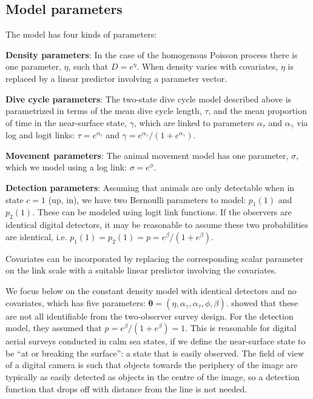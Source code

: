 \documentclass[useAMS, usenatbib, referee]{biom}\usepackage[]{graphicx}\usepackage[]{color}
\begin{document}
\subsection{Model parameters}
\label{sec:model_parameters}

The model has four kinds of parameters:

\textbf{Density parameters}: In the case of the homogenous Poisson process there is one parameter, $\eta$, such that $D=e^{\eta}$. When density varies with covariates, $\eta$ is replaced by a linear predictor involving a parameter vector.

\textbf{Dive cycle parameters}: The two-state dive cycle model described above is parametrized in terms of the mean dive cycle length, $\tau$, and the mean proportion of time in the near-surface state, $\gamma$, which are linked to parameters $\alpha_\tau$ and $\alpha_\gamma$ via log and logit links: $\tau=e^{\alpha_\tau}$ and $\gamma=e^{\alpha_\gamma}/(1+e^{\alpha_\gamma})$.

\textbf{Movement parameters}: The animal movement model has one parameter, $\sigma$, which we model using a log link: $\sigma=e^\phi$.

\textbf{Detection parameters}: Assuming that animals are only detectable when in state $c=1$ (up, in), we have two Bernoulli parameters to model: $p_1(1)$ and  $p_2(1)$. These can be modeled using logit link functions. If the observers are identical digital detectors, it may be reasonable to assume these two probabilities are identical, i.e. $p_1(1)=p_2(1)=p=e^\beta/(1+e^\beta)$.

Covariates can be incorporated by replacing the corresponding scalar parameter on the link scale with a suitable linear predictor involving the covariates.


We focus below on the constant density model with identical detectors and no covariates, which has five parameters: $\bm{\theta}=(\eta,\alpha_\gamma,\alpha_\tau, \phi, \beta)$. \cite{Stevenson+al:19} showed that these are not all identifiable from the two-observer survey design. For the detection model, they assumed that $p=e^\beta/(1+e^\beta)=1$. This is reasonable for digital aerial surveys conducted in calm sea states, if we define the near-surface state to be ``at or breaking the surface'': a state that is easily observed. The field of view of a digital camera is such that objects towards the periphery of the image are typically as easily detected as objects in the centre of the image, so a detection function that drops off with distance from the line is not needed.
\end{document}
